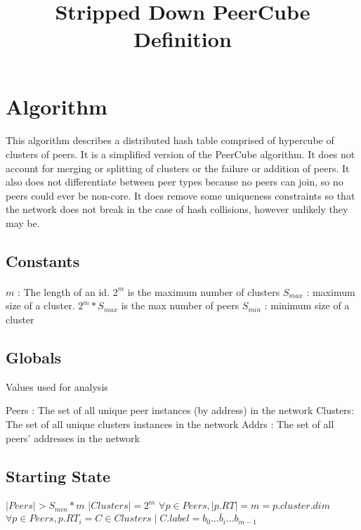 \documentclass[]{article}
\title{Stripped Down PeerCube Definition}
\begin{document}
	\maketitle
	\newpage
	\section{Algorithm}
		\paragraph{ }
			This algorithm describes a distributed hash table comprised of hypercube of clusters of peers. 
			It is a simplified version of the PeerCube algorithm. 
			It does not account for merging or splitting of clusters or the failure or addition of peers. 
			It also does not differentiate between peer types because no peers can join, so no peers could ever be non-core.
			It does remove some uniqueness constraints so that the network does not break in the case of hash collisions, however unlikely they may be.
		\subsection{Constants}
			\paragraph{ }
			\begin{algorithmic}
			    \State $m$ : The length of an id. $2^m$ is the maximum number of clusters
				\State $S_{max}$ : maximum size of a cluster. $2^m * S_{max}$ is the max number of peers
				\State $S_{min}$ : minimum size of a cluster
			\end{algorithmic}
			
			\subsection{Globals}
				Values used for analysis
					\begin{algorithmic}
						\State Peers : The set of all unique peer instances (by address) in the network
						\State Clusters: The set of all unique clusters instances in the network
						\State Addrs : The set of all peers' addresses in the network
					\end{algorithmic}

			\subsection{Starting State}
				\begin{algorithmic}
					\State $|Peers|>S_{min}*m$
					\State $|Clusters| = 2^m$
					\State $\forall p \in Peers, |p.RT| = m = p.cluster.dim$
					\State $\forall p \in Peers, p.RT_i = C \in Clusters \mid C.label = b_0...\bar{b}_i...b_{m-1}$
				\end{algorithmic}
\end{document}
